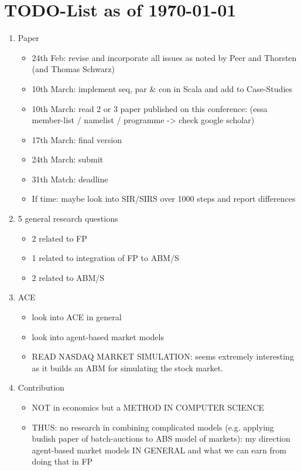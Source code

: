 \section{TODO-List as of \today}

\begin{enumerate}

\item Paper
	\begin{itemize}
    \item 24th Feb: revise and incorporate all issues as noted by Peer and Thorsten (and Thomas Schwarz)
    \item 10th March: implement seq, par \& con in Scala and add to Case-Studies
    \item 10th March: read 2 or 3 paper published on this conference: (essa member-list / namelist / programme -> check google scholar)
    \item 17th March: final version
    \item 24th March: submit 
    \item 31th Match: deadline
    \item If time: maybe look into SIR/SIRS over 1000 steps and report differences
    \end{itemize}
    
\item 5 general research questions
	\begin{itemize}
    \item 2 related to FP
    \item 1 related to integration of FP to ABM/S
    \item 2 related to ABM/S
    \end{itemize}
    
\item ACE
	\begin{itemize}
    \item look into ACE in general
    \item look into agent-based market models
	\item READ NASDAQ MARKET SIMULATION: seems extremely interesting as it builds an ABM for simulating the stock market.
	\end{itemize}
	 
\item Contribution
	\begin{itemize}    
    \item NOT in economics but a METHOD IN COMPUTER SCIENCE
    \item THUS: no research in combining complicated models (e.g. applying budish paper of batch-auctions to ABS model of markets): my direction agent-based market models IN GENERAL and what we can earn from doing that in FP
	\end{itemize}
	

\end{enumerate}
